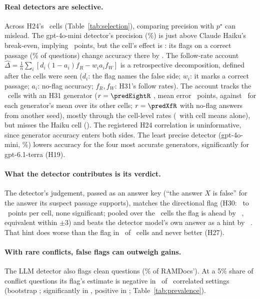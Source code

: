 \paragraph{Real detectors are selective.} Across H24's \hTwentyFourCells\ cells
(Table~\ref{tab:selection}), comparing precision with $p^\star$ can mislead. The gpt-4o-mini detector's precision
(\selHaikuMiniPrec\%) is just above Claude Haiku's break-even, implying \selHaikuMiniMarg\ points, but the cell's effect is
\selHaikuMiniObs: its flags on a correct passage (\selHaikuMiniWrongShare\% of questions) change accuracy there by
\selHaikuMiniWrongGain. The follow-rate account
$\hat\Delta=\frac1n\sum_i[d_i(1-a_i)f_R-w_ia_if_W]$ is a retrospective decomposition, defined after the cells were
seen ($d_i$: the flag
names the false side; $w_i$: it marks a correct passage; $a_i$: no-flag accuracy; $f_R,f_W$: H31's follow rates). The
account tracks the \predEightN\ cells with an H31 generator
($r=\predEightR$ \predEightRCI, mean error \predEightMae\ points, against \predGenMae\ for each generator's mean over
its other cells; $r=\predXfR$ with no-flag answers from another seed), mostly through the cell-level rates
(\predMargMae\ with cell means alone), but misses the Haiku cell (\predHaikuMini). The registered H24 correlation is uninformative, since generator accuracy
enters both sides. The least precise detector (gpt-4o-mini, \dirPrecMini\%) lowers accuracy for the four most
accurate generators, significantly for gpt-6.1-terra (H19).

\paragraph{What the detector contributes is its verdict.} The detector's judgement, passed as an answer key (``the
answer $X$ is false'' for the answer its suspect passage supports), matches the directional flag
(H30: \hThirtyAMin\ to \hThirtyAMax\ points per cell, none significant; pooled over the \PoolThirtyAK\ cells the flag
is ahead by \PoolThirtyA\ \PoolThirtyACI, equivalent within $\pm$3) and beats the detector model's own answer as a
hint by \PoolThirtyB\ \PoolThirtyBCI. That hint does worse than the flag in \nHTwentySevenAPos\ of
\nHTwentySevenATests\ cells and never better (H27).

\paragraph{With rare conflicts, false flags can outweigh gains.} The LLM detector also flags clean questions
(\cleanFprLlm\% of RAMDocs'). At a 5\% share of conflict questions its flag's estimate is negative in \prevNegFive\ of \prevN\ correlated settings
(bootstrap \prevNegFiveCI; significantly in \prevSigNeg, positive in \prevSigPos; Table~\ref{tab:prevalence}).

